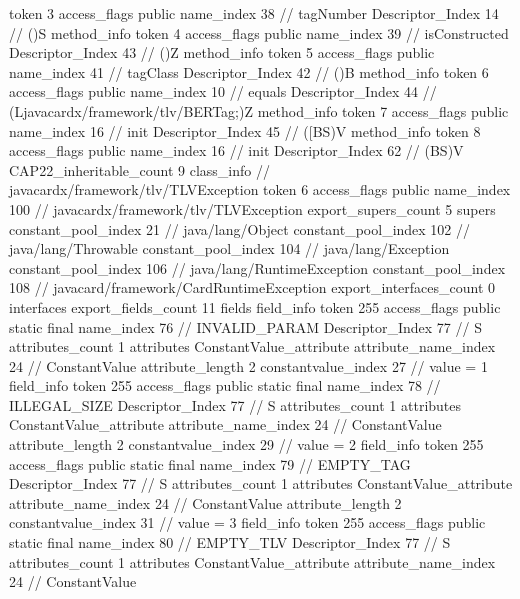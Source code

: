 {{{{{					token	3
					access_flags	public
					name_index	38		// tagNumber
					Descriptor_Index	14		// ()S
				}
				method_info {
					token	4
					access_flags	public
					name_index	39		// isConstructed
					Descriptor_Index	43		// ()Z
				}
				method_info {
					token	5
					access_flags	public
					name_index	41		// tagClass
					Descriptor_Index	42		// ()B
				}
				method_info {
					token	6
					access_flags	public
					name_index	10		// equals
					Descriptor_Index	44		// (Ljavacardx/framework/tlv/BERTag;)Z
				}
				method_info {
					token	7
					access_flags	public
					name_index	16		// init
					Descriptor_Index	45		// ([BS)V
				}
				method_info {
					token	8
					access_flags	public
					name_index	16		// init
					Descriptor_Index	62		// (BS)V
				}
			}
			CAP22_inheritable_count	9
		}
		class_info {		// javacardx/framework/tlv/TLVException
			token	6
			access_flags	public
			name_index	100		// javacardx/framework/tlv/TLVException
			export_supers_count	5
			supers {
				constant_pool_index	21		// java/lang/Object
				constant_pool_index	102		// java/lang/Throwable
				constant_pool_index	104		// java/lang/Exception
				constant_pool_index	106		// java/lang/RuntimeException
				constant_pool_index	108		// javacard/framework/CardRuntimeException
			}
			export_interfaces_count	0
			interfaces {
			}
			export_fields_count	11
			fields {
			field_info {
				token	255
				access_flags	public static final
				name_index	76		// INVALID_PARAM
				Descriptor_Index	77		// S
				attributes_count	1
				attributes {
				ConstantValue_attribute {
					attribute_name_index	24		// ConstantValue
					attribute_length	2
					constantvalue_index	27		// value = 1
				}
				}
			}
			field_info {
				token	255
				access_flags	public static final
				name_index	78		// ILLEGAL_SIZE
				Descriptor_Index	77		// S
				attributes_count	1
				attributes {
				ConstantValue_attribute {
					attribute_name_index	24		// ConstantValue
					attribute_length	2
					constantvalue_index	29		// value = 2
				}
				}
			}
			field_info {
				token	255
				access_flags	public static final
				name_index	79		// EMPTY_TAG
				Descriptor_Index	77		// S
				attributes_count	1
				attributes {
				ConstantValue_attribute {
					attribute_name_index	24		// ConstantValue
					attribute_length	2
					constantvalue_index	31		// value = 3
				}
				}
			}
			field_info {
				token	255
				access_flags	public static final
				name_index	80		// EMPTY_TLV
				Descriptor_Index	77		// S
				attributes_count	1
				attributes {
				ConstantValue_attribute {
					attribute_name_index	24		// ConstantValue
}}}}}}}
